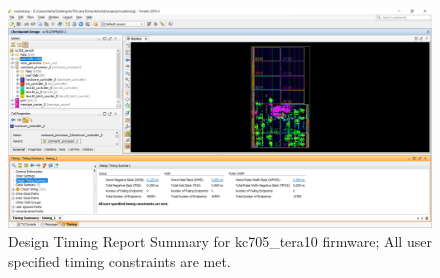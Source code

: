 \begin{figure}[H]
	\centering
	\includegraphics[width=0.95\linewidth]{IMG/ch4/TIMING_perfect}
	\caption{Design Timing Report Summary for kc705\_tera10 firmware; All user specified timing constraints are met.}
	\label{fig:timingperfect}
\end{figure}

